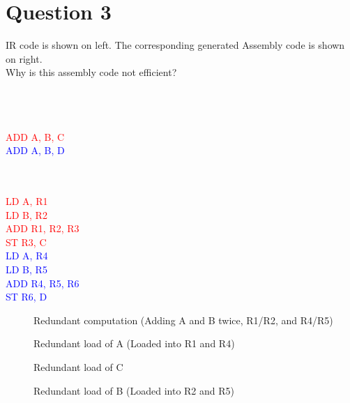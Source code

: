 \documentclass{article}
\newcommand{\cmark}{\ding{51}}%
\newcommand{\xmark}{\ding{55}}%
\newcommand{\textb}[1]{\textcolor{blue}{#1}}
\newcommand{\textr}[1]{\textcolor{red}{#1}}
\begin{document}
\section*{Question 3}
IR code is shown on left.  The corresponding generated Assembly code is shown on right. \\
Why is this assembly code not efficient?
\vspace{-1em}
\begin{multicols}{3}
 \ \\ \ \\ \ \\
\textr{ADD A, B, C} \\
\textb{ADD A, B, D}
\vfill\columnbreak
 \ \\ \ \\ \ \\
\vfill\columnbreak
\textr{LD A, R1} \\
\textr{LD B, R2} \\
\textr{ADD R1, R2, R3} \\
\textr{ST R3, C} \\
\textb{LD A, R4} \\
\textb{LD B, R5} \\
\textb{ADD R4, R5, R6} \\
\textb{ST R6, D}
\end{multicols}
\begin{description}
  \item [\cmark] Redundant computation \hspace{2.1em} (Adding A and B twice, R1/R2, and R4/R5)
  \item [\cmark] Redundant load of A \hspace{3.5em} (Loaded into R1 and R4)
  \item [\xmark] Redundant load of C
  \item [\cmark] Redundant load of B \hspace{3.5em} (Loaded into R2 and R5) 
\end{description}
\end{document}
